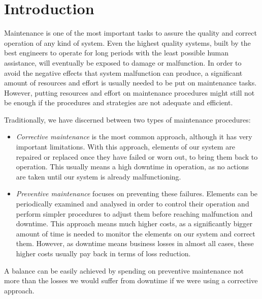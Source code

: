\documentclass[a4paper,12pt]{article}
\begin{document}
\cleardoublepage
{} %
\listoftables %
\cleardoublepage

\setcounter{page}{1}
\section{Introduction}\label{sec:context}
Maintenance is one of the most important tasks to assure the quality and correct operation of any kind of system. Even the highest quality systems, built by the best engineers to operate for long periods with the least possible human assistance, will eventually be exposed to damage or malfunction. In order to avoid the negative effects that system malfunction can produce, a significant amount of resources and effort is usually needed to be put on maintenance tasks. However, putting resources and effort on maintenance procedures might still not be enough if the procedures and strategies are not adequate and efficient.

Traditionally, we have discerned between two types of maintenance procedures:
\begin{itemize}
\item \emph{Corrective maintenance} is the most common approach, although it has very important limitations. With this approach, elements of our system are repaired or replaced once they have failed or worn out, to bring them back to operation. This usually means a high downtime in operation, as no actions are taken until our system is already malfunctioning.

\item \emph{Preventive maintenance} focuses on preventing these failures. Elements can be periodically examined and analysed in order to control their operation and perform simpler procedures to adjust them before reaching malfunction and downtime. This approach means much higher costs, as a significantly bigger amount of time is needed to monitor the elements on our system and correct them. However, as downtime means business losses in almost all cases, these higher costs usually pay back in terms of loss reduction.
\end{itemize}

A balance can be easily achieved by spending on preventive maintenance not more than the losses we would suffer from downtime if we were using a corrective approach.
\end{document}
